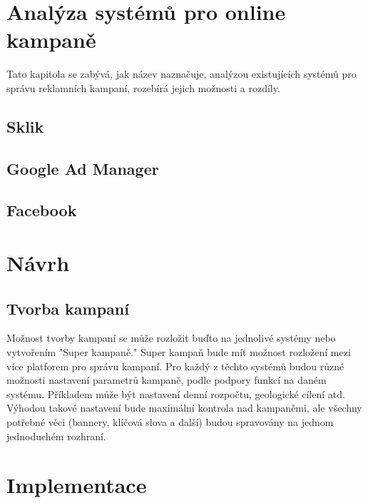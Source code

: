 \documentclass[czech,semestral]{diploma}
\begin{document}
\chapter{Analýza systémů pro online kampaně}
Tato kapitola se zabývá, jak název naznačuje, analýzou existujících systémů pro správu reklamních kampaní, rozebírá jejich možnosti a rozdíly.


\section{Sklik}

\section{Google Ad Manager}

\section{Facebook}


\chapter{Návrh}

\section{Tvorba kampaní}
Možnost tvorby kampaní se může rozložit buďto na jednolivé systémy nebo vytvořením "Super kampaně." Super kampaň bude mít možnost rozložení mezi více platforem pro správu kampaní.
Pro každý z těchto systémů budou různé možnosti nastavení parametrů kampaně, podle podpory funkcí na daném systému. Příkladem může být nastavení denní rozpočtu, geologické cílení atd.
Výhodou takové nastavení bude maximální kontrola nad kampaněmi, ale všechny potřebné věci (bannery, klíčová slova a další) budou spravovány na jednom jednoduchém rozhraní.

\chapter{Implementace}


\printbibliography[title={Literatura}, heading=bibintoc]
\end{document}
